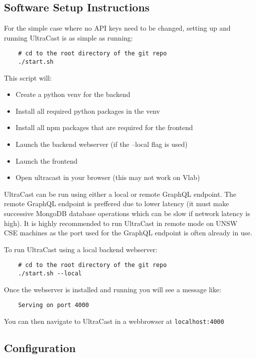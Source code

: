 \documentclass[../report.tex]{subfiles}
\begin{document}
   

\subsection{Software Setup Instructions}

For the simple case where no API keys need to be changed, setting up and running UltraCast is as simple as running:

\begin{verbatim}
    # cd to the root directory of the git repo
    ./start.sh
\end{verbatim}
%
This script will: 
\begin{itemize}
    \item Create a python venv for the backend
    \item Install all required python packages in the venv
    \item Install all npm packages that are required for the frontend
    \item Launch the backend webserver (if the --local flag is used)
    \item Launch the frontend
    \item Open ultracast in your browser (this may not work on Vlab)
\end{itemize}

UltraCast can be run using either a local or remote GraphQL endpoint.
The remote GraphQL endpoint is preffered due to lower latency (it must make successive MongoDB database operations which can be slow if network latency is high).
It is highly recommended to run UltraCast in remote mode on UNSW CSE machines as the port used for the GraphQL endpoint is often already in use.

To run UltraCast using a local backend webserver:

\begin{verbatim}
    # cd to the root directory of the git repo
    ./start.sh --local
\end{verbatim}

Once the webserver is installed and running you will see a message like:

\begin{verbatim}
    Serving on port 4000
\end{verbatim}

You can then navigate to UltraCast in a webbrowser at \verb|localhost:4000|

\subsection{Configuration}
\end{document}
